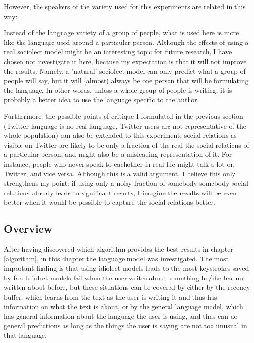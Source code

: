 \documentclass[12pt]{article}
\begin{document}
However, the speakers of the variety used for this experiments are related in this way:


Instead of the language variety of a group of people, what is used here is more like the language used around a particular person. Although the effects of using a real sociolect model might be an interesting topic for future research, I have chosen not investigate it here, because my expectation is that it will not improve the results. Namely, a 'natural' sociolect model can only predict what a group of people will say, but it will (almost) always be one person that will be formulating the language. In other words, unless a whole group of people is writing, it is probably a better idea to use the language specific to the author.


Furthermore, the possible points of critique I formulated in the previous section (Twitter language is no real language, Twitter users are not representative of the whole population) can also be extended to this experiment: social relations as visible on Twitter are likely to be only a fraction of the real the social relations of a particular person, and might also be a misleading representation of it. For instance, people who never speak to eachother in real life might talk a lot on Twitter, and vice versa. Although this is a valid argument, I believe this only strengthens my point: if using only a noisy fraction of somebody somebody social relations already leads to significant results, I imagine the results will be even better when it would be possible to capture the social relations better.

\subsection{Overview}
After having discovered which algorithm provides the best results in chapter \ref{algorithm}, in this chapter the language model was investigated. The most important finding is that using idiolect models leads to the most keystrokes saved by far. Idiolect models fail when the user writes about something he/she has not written about before, but these situations can be covered by either by the recency buffer, which learns from the text as the user is writing it and thus has information on what the text is about, or by the general language model, which has general information about the language the user is using, and thus can do general predictions as long as the things the user is saying are not too unusual in that language. 
\end{document}
